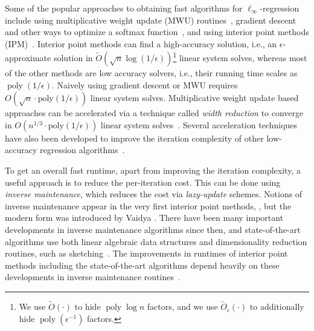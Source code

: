 \documentclass[11pt]{article}
\newcommand\Otil{\widetilde{O}}
\newcommand{\wt}{\widetilde}
\DeclareMathOperator*{\poly}{{\mathrm{poly}}}
\begin{document}
Some of the popular approaches to obtaining fast algorithms for $\ell_{\infty}$-regression 
include using 
multiplicative weight update (MWU) routines~\cite{BN51,AHK12,christiano2011electrical,chin2013runtime,adil2019iterative,ene2019improved,adil2021unifying},
gradient descent~\cite{S13,kelner2014almost} and other ways to optimize a softmax function~\cite{carmon2020acceleration,sidford2018coordinate,adil2021unifying},
and using interior point methods (IPM)~\cite{K84,R88,nesterov1994interior}.
Interior point methods can find a high-accuracy solution, i.e., an $\epsilon$-approximate solution in $\Otil(\sqrt{n}\log (1/\epsilon))$\footnote{We use $\wt{O}(\cdot)$ to hide $\poly \log n$ factors, and we use $\Otil_{\epsilon}(\cdot)$ to additionally hide $\poly(\epsilon^{-1})$ factors.} linear system solves,
whereas most of the other methods are low accuracy solvers, i.e., their running time scales as $\operatorname{poly}(1/\epsilon)$.
Naively using gradient descent or MWU requires 
$O(\sqrt{n} \cdot \text{poly} (1/\epsilon))$ linear system solves.
Multiplicative weight update based approaches can be accelerated via a technique called {\it width reduction} to converge in $O(n^{1/3}\cdot\text{poly} (1/\epsilon))$ linear system solves~\cite{christiano2011electrical,chin2013runtime,adil2019iterative,ene2019improved,adil2021unifying,adil2022fast}.
Several acceleration techniques have also been developed to improve the iteration complexity of other low-accuracy regression algorithms~\cite{MS13,B18,carmon2020acceleration,sidford2018coordinate, adil2021unifying}.

To get an overall fast runtime, apart from improving the iteration complexity, a useful approach is to reduce the per-iteration cost.
This can be done using {\it inverse maintenance}, which reduces the cost via {\it lazy-update} schemes. 
Notions of inverse maintenance appear in the very first interior point methods, \cite{K84,NN89}, but the modern form was introduced by Vaidya \cite{V89}.
There have been many important developments in inverse maintenance algorithms since then, and state-of-the-art algorithms use both linear algebraic data structures and dimensionality reduction routines, such as sketching~\cite{bns19}. The improvements in runtimes of interior point methods including the state-of-the-art algorithms depend heavily on these developments in inverse maintenance routines~\cite{lee2015efficient,cohen2021solving,vdB20,jiang2021faster,lee2021tutorial}.
\end{document}
